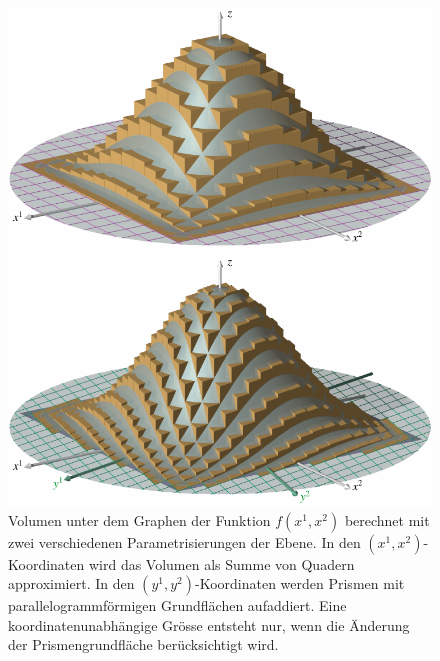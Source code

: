 %
%
%
\begin{figure}
\centering
\includegraphics[width=\textwidth]{chapters/040-green/images/volint.pdf}
\caption{Volumen unter dem Graphen der Funktion $f(x^1,x^2)$ berechnet mit
zwei verschiedenen Parametrisierungen der Ebene.
In den $(x^1,x^2)$-Koordinaten wird das Volumen als Summe von Quadern
approximiert.
In den $(y^1,y^2)$-Koordinaten werden Prismen mit parallelogrammförmigen
Grundflächen aufaddiert.
Eine koordinatenunabhängige Grösse entsteht nur, wenn die Änderung
der Prismengrundfläche berücksichtigt wird.
\label{buch:green:fig:volint}}
\end{figure}
